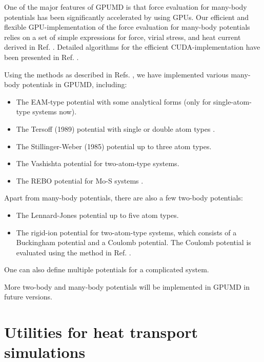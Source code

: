 \documentclass[12pt,a4paper]{report}
\begin{document}
One of the major features of GPUMD is that force evaluation for many-body potentials has been significantly accelerated by using GPUs. Our efficient and flexible GPU-implementation of the force evaluation for many-body potentials relies on a set of simple expressions for force, virial stress, and heat current derived in Ref. \cite{fan2015prb}. Detailed algorithms for the efficient CUDA-implementation have been presented in Ref. \cite{fan2017cpc}.

Using the methods as described in Refs. \cite{fan2015prb,fan2017cpc}, we have implemented various many-body potentials in GPUMD, including:
\begin{itemize}
\item The EAM-type potential with some analytical forms \cite{zhou2004prb,dai2006jpcm} (only for single-atom-type systems now).
\item The Tersoff (1989) potential with single or double atom types \cite{tersoff1989prb}.
\item The Stillinger-Weber (1985) potential \cite{stillinger1985prb} up to three atom types.
\item The Vashishta potential \cite{vashishta2007jap} for two-atom-type systems.
\item The REBO potential for Mo-S systems \cite{liang2009prb,liang2012prb_erratum}.
\end{itemize}

Apart from many-body potentials, there are also a few two-body potentials:
\begin{itemize}
\item The Lennard-Jones potential up to five atom types. 
\item The rigid-ion potential for two-atom-type systems, which consists of a Buckingham potential and a Coulomb potential. The Coulomb potential is evaluated using the method in Ref. \cite{fennell2006jcp}.
\end{itemize}

One can also define multiple potentials for a complicated system. 

More two-body and many-body potentials will be implemented in GPUMD in future versions.

\section{Utilities for heat transport simulations}
\end{document}
